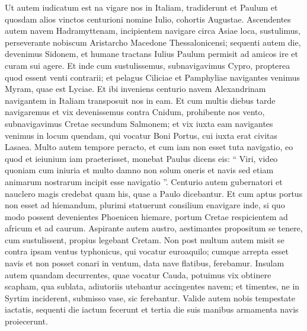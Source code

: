 \begin{biblechapter}
\begin{biblechapter}
\begin{biblechapter}
\begin{biblechapter}
\begin{biblechapter}
\begin{biblechapter}
\begin{biblechapter}
\begin{biblechapter}
\begin{biblechapter}
\begin{biblechapter}
\begin{biblechapter}
\begin{biblechapter}
\begin{biblechapter}
\begin{biblechapter}
\begin{biblechapter}
\begin{biblechapter}
\begin{biblechapter}
\begin{biblechapter}
\begin{biblechapter}
\begin{biblechapter}
\begin{biblechapter}
\begin{biblechapter}
\begin{biblechapter}
\begin{biblechapter}
\begin{biblechapter}
\begin{biblechapter}
\begin{biblechapter}
\verse Ut autem iudicatum est na vigare nos in Italiam, tradiderunt et Paulum et quosdam alios vinctos centurioni nomine Iulio, cohortis Augustae. 
\verse Ascendentes autem navem Hadramyttenam, incipientem navigare circa Asiae loca, sustulimus, perseverante nobiscum Aristarcho Macedone Thessalonicensi; 
\verse sequenti autem die, devenimus Sidonem, et humane tractans Iulius Paulum permisit ad amicos ire et curam sui agere. 
\verse Et inde cum sustulissemus, subnavigavimus Cypro, propterea quod essent venti contrarii; 
\verse et pelagus Ciliciae et Pamphyliae navigantes venimus Myram, quae est Lyciae. 
\verse Et ibi inveniens centurio navem Alexandrinam navigantem in Italiam transposuit nos in eam. 
\verse Et cum multis diebus tarde navigaremus et vix devenissemus contra Cnidum, prohibente nos vento, subnavigavimus Cretae secundum Salmonem; 
\verse et vix iuxta eam navigantes venimus in locum quendam, qui vocatur Boni Portus, cui iuxta erat civitas Lasaea. 
\verse Multo autem tempore peracto, et cum iam non esset tuta navigatio, eo quod et ieiunium iam praeterisset, monebat Paulus 
 \verse dicens eis: “ Viri, video quoniam cum iniuria et multo damno non solum oneris et navis sed etiam animarum nostrarum incipit esse navigatio ”. 
\verse Centurio autem gubernatori et nauclero magis credebat quam his, quae a Paulo dicebantur. 
 \verse Et cum aptus portus non esset ad hiemandum, plurimi statuerunt consilium enavigare inde, si quo modo possent devenientes Phoenicen hiemare, portum Cretae respicientem ad africum et ad caurum.
 \verse Aspirante autem austro, aestimantes propositum se tenere, cum sustulissent, propius legebant Cretam. 
\verse Non post multum autem misit se contra ipsam ventus typhonicus, qui vocatur euroaquilo; 
\verse cumque arrepta esset navis et non posset conari in ventum, data nave flatibus, ferebamur. 
\verse Insulam autem quandam decurrentes, quae vocatur Cauda, potuimus vix obtinere scapham, 
\verse qua sublata, adiutoriis utebantur accingentes navem; et timentes, ne in Syrtim inciderent, submisso vase, sic ferebantur. 
\verse Valide autem nobis tempestate iactatis, sequenti die iactum fecerunt 
\verse et tertia die suis manibus armamenta navis proiecerunt. 

\end{biblechapter}
\end{biblechapter}
\end{biblechapter}
\end{biblechapter}
\end{biblechapter}
\end{biblechapter}
\end{biblechapter}
\end{biblechapter}
\end{biblechapter}
\end{biblechapter}
\end{biblechapter}
\end{biblechapter}
\end{biblechapter}
\end{biblechapter}
\end{biblechapter}
\end{biblechapter}
\end{biblechapter}
\end{biblechapter}
\end{biblechapter}
\end{biblechapter}
\end{biblechapter}
\end{biblechapter}
\end{biblechapter}
\end{biblechapter}
\end{biblechapter}
\end{biblechapter}
\end{biblechapter}
